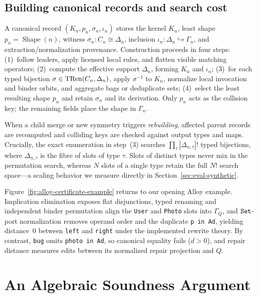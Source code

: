 \subsection{Building canonical records and search cost}
\label{sec:canonicalization-procedure}

A canonical record $(K_n,p_n,\sigma_n,\iota_n)$ stores the kernel $K_n$, least
shape $p_n=\operatorname{Shape}(n)$, witness $\sigma_n:C_n\cong\Delta_n$,
inclusion $\iota_n:\Delta_n\hookrightarrow\Gamma_n$, and extraction/normalization
provenance. Construction proceeds in four steps:
(1)~follow leaders, apply licensed local rules, and flatten visible matching
operators;
(2)~compute the effective support $\Delta_n$, forming $K_n$ and $\iota_n$;
(3)~for each typed bijection $\sigma\in\operatorname{TRen}(C_n,\Delta_n)$, apply
$\sigma^{-1}$ to $K_n$, normalize local invocation and binder orbits, and
aggregate bags or deduplicate sets;
(4)~select the least resulting shape $p_n$ and retain $\sigma_n$ and its
derivation.
Only $p_n$ acts as the collision key; the remaining fields place the shape in
$\Gamma_n$.

When a child merge or new symmetry triggers \emph{rebuilding}, affected parent
records are recomputed and colliding keys are checked against output types and
maps. Crucially, the exact enumeration in step~(3) searches
$\prod_\tau|\Delta_{n,\tau}|!$ typed bijections, where $\Delta_{n,\tau}$ is
the fibre of slots of type $\tau$. Slots of distinct types never mix in the
permutation search, whereas $N$ slots of a single type retain the full $N!$
search space—a scaling behavior we measure directly in Section~\ref{sec:eval-synthetic}.



Figure~\ref{fig:alloy-certificate-example} returns to our opening Alloy
example. Implication elimination exposes flat disjunctions, typed renaming and
independent binder permutation align the \texttt{User} and \texttt{Photo}
slots into $\Gamma_Q$, and $\texttt{Set}$-port normalization removes operand order and
the duplicate \texttt{p in Ad}, yielding distance~0 between \texttt{left} and
\texttt{right} under the implemented rewrite theory. By contrast, \texttt{bug}
omits \texttt{photo in Ad}, so canonical equality fails ($d>0$), and repair
distance measures edits between its normalized repair projection and $Q$.

\section{An Algebraic Soundness Argument}
\label{sec:metatheory}

